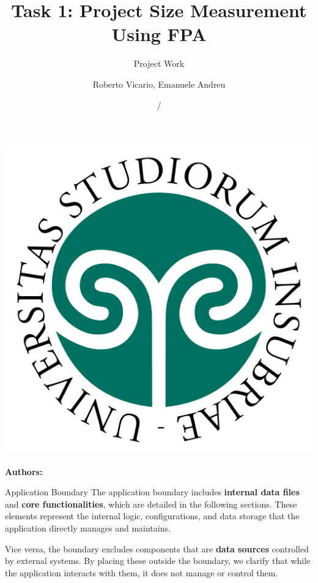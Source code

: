 \documentclass[12pt]{beamer}
\title[University of Insubria]{Task 1: Project Size Measurement Using FPA}
\subtitle{Project Work}
\author[Roberto Vicario, Emanuele Andreu]{Roberto Vicario, Emanuele Andreu}
\institute[]{University of Insubria}
\date{\currentyear/\nextyear} %
\begin{document}
% 
% 
\begin{frame}[allowframebreaks]{}
\vspace{\fill}

\includegraphics[width=0.16\linewidth]{img/uninsubria.png}

\vspace{\fill}

\Large
\color{main}
\inserttitle

\medskip

\large
\color{black}
\insertsubtitle

\vspace{\fill}

\footnotesize
\insertinstitute

\vspace{\fill}

\textbf{Authors:} \insertauthor

\medskip

\insertdate

\vspace{\fill}
\end{frame}

% 
% 
\begin{frame}[allowframebreaks]{Application Boundary}
The application boundary includes \textbf{internal data files} and \textbf{core functionalities}, which are detailed in the following sections. These elements represent the internal logic, configurations, and data storage that the application directly manages and maintains.

\bigskip

Vice versa, the boundary excludes components that are \textbf{data sources} controlled by external systems. By placing these outside the boundary, we clarify that while the application interacts with them, it does not manage or control them.
\end{frame}
\end{document}
